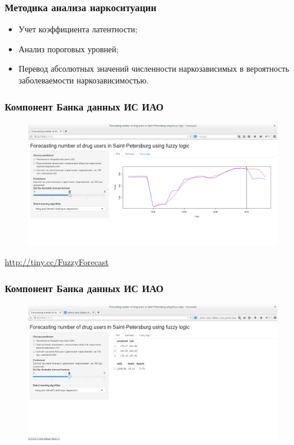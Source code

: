 \documentclass[t]{beamer}  %
\begin{document}
\begin{frame}
    \frametitle{Методика анализа наркоситуации} 
	\begin{itemize}
        \item Учет коэффициента латентности;
        \item Анализ пороговых уровней;
        \item Перевод абсолютных значений численности наркозависимых в
            вероятность заболеваемости наркозависимостью.
	\end{itemize}
\end{frame}

\begin{frame}
    \frametitle{Компонент Банка данных ИС ИАО}
    \begin{figure}
        \centering
        \includegraphics[width=\textwidth]{screenshot1.png}
    \end{figure}
    \url{http://tiny.cc/FuzzyForecast}
\end{frame}
\begin{frame}
    \frametitle{Компонент Банка данных ИС ИАО}
    \begin{figure}
        \centering
        \includegraphics[width=\textwidth]{screenshot2.png}
    \end{figure}
\end{frame}
\end{document}

